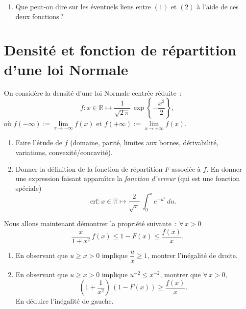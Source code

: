 \begin{enumerate}
\def\labelenumi{\arabic{enumi}.}
\setcounter{enumi}{8}
\tightlist
\item
  Que peut-on dire sur les éventuels liens entre \((1)\) et \((2)\) à
  l'aide de ces deux fonctions\,?
\end{enumerate}


\section{Densité et fonction de répartition d'une loi
Normale}\label{I-densituxe9-et-fonction-de-ruxe9partition-dune-loi-normale}

On considère la densité d'une loi Normale centrée réduite~:
\[f : x\in \mathbb{R}\mapsto \dfrac{1}{\sqrt{2\,\pi}}\,\exp\left\{-\dfrac{x^2}{2}\right\},\]
où \(f(-\infty) := \lim\limits_{x\to-\infty} f(x)\) et
\(f(+\infty) := \lim\limits_{x\to+\infty} f(x)\).

\label{I-fdrgaussprop}

\begin{enumerate}
\def\labelenumi{\arabic{enumi}.}
\item
  Faire l'étude de \(f\) (domaine, parité, limites aux bornes,
  dérivabilité, variations, convexité/concavité).
\item
  Donner la définition de la fonction de répartition \(F\) associée à
  \(f\). En donner une expression faisant apparaître la \emph{fonction
  d'erreur} (qui est une fonction spéciale)
  \[\text{erf} : x\in\mathbb{R}\mapsto \dfrac{2}{\sqrt{\pi}}\,\int_{0}^x e^{-u^2}\,du.\]
\end{enumerate}


\label{I-fdrgaussenca}
Nous allons maintenant démontrer la propriété suivante~:
\(\forall\,x > 0\)
\[ \dfrac{x}{1+x^2}\,f(x) \leq 1 - F(x) \leq \dfrac{f(x)}{x}. \]

\begin{enumerate}
\def\labelenumi{\arabic{enumi}.}
\setcounter{enumi}{2}
\item
  En observant que \(u\geq x >0\) implique \(\dfrac{u}{x} \geq 1\),
  montrer l'inégalité de droite.
\item
  En observant que \(u\geq x > 0\) implique \(u^{-2} \leq x^{-2}\),
  montrer que \(\forall\,x>0\),
  \[\left(1+\dfrac{1}{x^2}\right)\,\left(1-F(x)\right) \geq \dfrac{f(x)}{x}.\]
  En déduire l'inégalité de gauche.
\end{enumerate}

